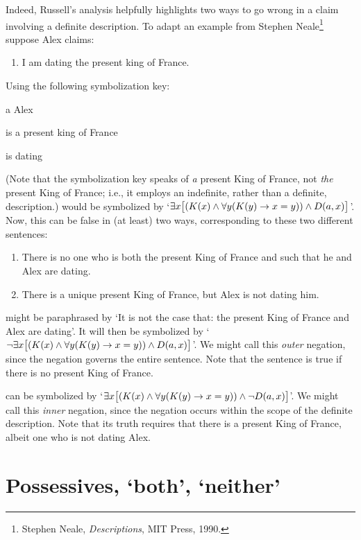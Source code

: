 Indeed, Russell's analysis helpfully highlights two ways to go wrong
in a claim involving a definite description. To adapt an example from
Stephen Neale\footnote{Stephen Neale, \textit{Descriptions},
MIT Press, 1990.} suppose Alex claims:
	\begin{enumerate}
		\item\label{kingdate} I am dating the present king of France.
	\end{enumerate}
Using the following symbolization key:
	\begin{ekey}
		\item[a] Alex
		\item[\atom{K}{x}]  is a present king of France
		\item[\atom{D}{x,y}]  is dating 
	\end{ekey}
	(Note that the symbolization key speaks of \emph{a} present King of France, not \emph{the} present King of France; i.e., it employs an indefinite, rather than a definite, description.)  would be symbolized by `$\exists x \bigl[(K(x) \wedge \forall y(K(y) \rightarrow  x = y)) \wedge D(a,x)\bigr]$'. Now, this can be false in (at least) two ways, corresponding to these two different sentences:
	\begin{enumerate}
		\item\label{outernegation} There is no one who is both the present King of France and such that he and Alex are dating.
		\item\label{innernegation} There is a unique present King of France, but Alex is not dating him.
	\end{enumerate}
 might be paraphrased by `It is not the case that: the present King of France and Alex are dating'. It will then be symbolized by `$\neg \exists x\bigl[(K(x) \wedge \forall y(K(y) \rightarrow  x = y)) \wedge D(a,x) \bigr]$'. We might call this \emph{outer} negation, since the negation governs the entire sentence. Note that the sentence is true if there is no present King of France.

 can be symbolized by `$\exists x \bigl[(K(x) \wedge \forall y(K(y) \rightarrow x = y)) \wedge \neg D(a,x)\bigr]$'. We might call this \emph{inner} negation, since the negation occurs within the scope of the definite description. Note that its truth requires that there is a present King of France, albeit one who is not dating Alex.

\section{Possessives, `both', `neither'}


